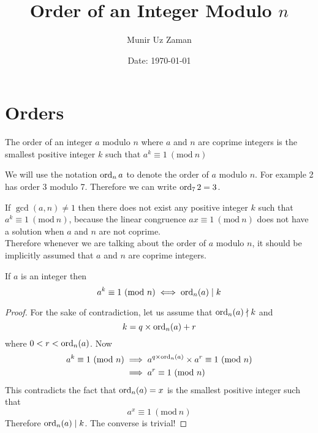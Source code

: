 \documentclass[11pt,numbers=noenddot,svgnames,dvipsnames]{scrartcl}
\title{Order of an Integer Modulo $n$}
\author{Munir Uz Zaman}
\date{Date: \today}
\renewcommand{\pmod}[1]{\ (\mathrm{mod}\ #1)}
\begin{document}
\maketitle

\section{Orders}

\begin{definition}
    The order of an integer $a$ modulo $n$ where $a$ and $n$ are coprime integers 
    is the smallest positive integer $k$ such that $a^{k} \equiv 1 \pmod{n}$
\end{definition}
We will use the notation $\operatorname{ord}_{n} a$ to denote the order of $a$ modulo $n$. 
For example 2 has order 3 modulo 7. Therefore we can write  $\operatorname{ord}_{7} 2 = 3$. 

\begin{remark}
    If $\gcd(a, n) \neq 1$ then there does not exist any positive integer $k$ such that 
    $a^{k} \equiv 1 \pmod n$, because the linear congruence $ax \equiv 1 \pmod n$ does not 
    have a solution when $a$ and $n$ are not coprime. \\
    Therefore whenever we are talking about the order of $a$ modulo $n$, 
    it should be implicitly assumed that $a$ and $n$ are coprime integers.
\end{remark}

\begin{theorem}
    If $a$ is an integer then 
    \[
        a^{k} \equiv 1 \pmod{n} \iff \ord_{n}(a)\mid k
    \]
\end{theorem}
\begin{proof}
    For the sake of contradiction, let us assume that $\operatorname{ord}_{n}(a) \nmid k$ and 
    \[ k = q\times \operatorname{ord}_{n}(a) + r \] where $0 < r < \operatorname{ord}_{n}(a)$. 
    Now 
    \begin{align*}
        a^k \equiv 1 \pmod n &\implies a^{q \times \ord_n(a)} \times a^r \equiv 1 \pmod n\\
                             &\implies a^r \equiv 1 \pmod n
    \end{align*}
    This contradicts the fact that $\operatorname{ord}_{n}(a)=x$ is the smallest positive integer such that 
    \[
        a^{x} \equiv 1 \pmod n
    \]
    Therefore $\operatorname{ord}_{n}(a) \mid k$. The converse is trivial!
\end{proof}
\end{document}
